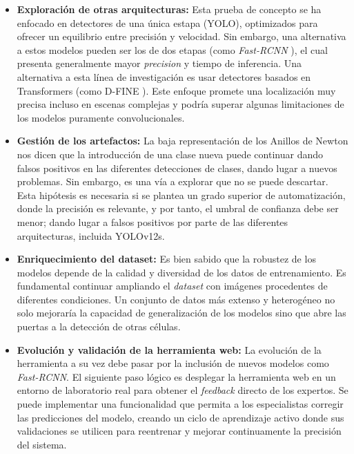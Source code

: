 \documentclass[12pt,a4paper,onecolumn,oneside]{report}
\begin{document}
\begin{itemize}
  \item \textbf{Exploración de otras arquitecturas:} Esta prueba de concepto se ha enfocado en detectores de una única estapa (YOLO), optimizados para ofrecer un equilibrio entre precisión y velocidad. Sin embargo, 
  una alternativa a estos modelos pueden ser los de dos etapas (como \textit{Fast-RCNN} \cite{7410526}), el cual presenta generalmente mayor \textit{precision} y tiempo de inferencia. Una alternativa a esta línea de investigación es usar detectores basados en Transformers
  (como D-FINE \cite{peng2024dfineredefineregressiontask}). Este enfoque promete una localización muy precisa incluso en escenas complejas y podría superar algunas limitaciones de los modelos puramente convolucionales.
  \item \textbf{Gestión de los artefactos:} La baja representación de los Anillos de Newton nos dicen que la introducción de una clase nueva puede continuar dando falsos positivos en las diferentes detecciones de clases, dando lugar
  a nuevos problemas. Sin embargo, es una vía a explorar que no se puede descartar. Esta hipótesis es necesaria si se plantea un grado superior de automatización, donde la precisión es relevante, y por tanto, el umbral de confianza debe ser menor; 
  dando lugar a falsos positivos por parte de las diferentes arquitecturas, incluida YOLOv12s.
  \item \textbf{Enriquecimiento del dataset:} Es bien sabido que la robustez de los modelos depende de la calidad y diversidad de los datos de entrenamiento. Es fundamental continuar ampliando el \textit{dataset} con imágenes procedentes de diferentes condiciones.
  Un conjunto de datos más extenso y heterogéneo no solo mejoraría la capacidad de generalización de los modelos sino que abre las puertas a la detección de otras células.
  \item \textbf{Evolución y validación de la herramienta web:} La evolución de la herramienta a su vez debe pasar por la inclusión de nuevos modelos como \textit{Fast-RCNN}. El siguiente paso lógico es desplegar la herramienta web en un entorno de laboratorio real 
  para obtener el \textit{feedback} directo de los expertos. Se puede implementar una funcionalidad que permita a los especialistas corregir las predicciones del modelo, creando un ciclo de aprendizaje activo donde sus validaciones se utilicen para reentrenar y mejorar continuamente la precisión del sistema.
\end{itemize}
\end{document}
